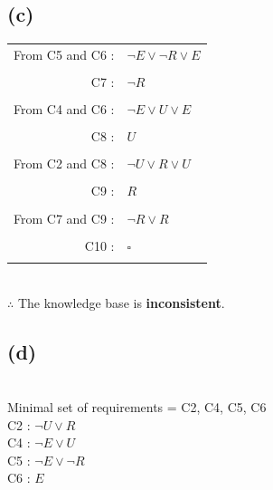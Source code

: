 \documentclass[a4paper,12pt]{article}
\begin{document}
\subsection{(c)}
\begin{tabular}{rl}
    From C5 and C6 : & $\neg E \lor \neg R \lor E$ \\\\
    C7 : & $\neg R$ \\\\
    From C4 and C6 : & $\neg E \lor U \lor E$\\\\
    C8 : & $U$ \\\\
    From C2 and C8 : & $\neg U \lor R \lor U$\\\\
    C9 : & $R$\\\\
    From C7 and C9 : & $\neg R \lor R$\\\\
    C10 : & $\square$\\\\
\end{tabular}
\,\\
$\therefore$ The knowledge base is \textbf{inconsistent}.\\

\subsection{(d)}
\,\\
Minimal set of requirements = C2, C4, C5, C6\\
C2 : $\neg U \lor R$\\
C4 : $\neg E \lor U$\\
C5 : $\neg E \lor \neg R$\\
C6 : $E$\\
\end{document}
